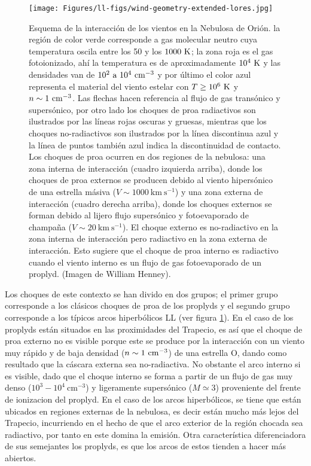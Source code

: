 \begin{figure}
  \centering
  \texttt{[image: Figures/ll-figs/wind-geometry-extended-lores.jpg]}
  \caption{Esquema de la interacción de los vientos en la Nebulosa de Orión. la región de color verde corresponde a gas molecular neutro cuya temperatura oscila entre los 50 y los \(1000~\mathrm{K}\); la zona roja es el gas fotoionizado, ahí la temperatura es de aproximadamente \(10^{4}~\mathrm{K}\) y las densidades van de \(10^{2} ~\text{a}~10^{4} ~\mathrm{cm}^{-3}\) y por último el color azul representa el material del viento estelar con \(T \geq 10^{6}~\mathrm{K}\) y \(n \sim 1~\mathrm{cm}^{-3}\). Las flechas hacen referencia al flujo de gas transónico y supersónico, por otro lado los choques de proa radiactivos son ilustrados por las líneas rojas oscuras y gruesas, mientras que los choques no-radiactivos son ilustrados por la línea discontinua azul y la línea de puntos también azul indica la discontinuidad de contacto. Los choques de proa ocurren en dos regiones de la nebulosa: una zona interna de interacción (cuadro izquierda arriba), donde los choques de proa externos se producen debido al viento hipersónico de una estrella másiva (\(V \sim 1000~\text{km}~\text{s}^{-1}\)) y una zona externa de interacción (cuadro derecha arriba), donde los  choques externos se forman debido al lijero  flujo supersónico y fotoevaporado de champaña (\(V \sim 20~\text{km}~\text{s}^{-1}\)). El choque externo es no-radiactivo en la zona interna de interacción pero radiactivo en la zona externa de interacción. Esto sugiere que el choque de proa interno es radiactivo cuando el viento interno es un flujo de gas fotoevaporado de un proplyd. (Imagen de William Henney). }
  \label{fig:esquema-interraccion-vientos}
\end{figure}

Los choques de este contexto se han divido en dos grupos; el primer grupo corresponde a los clásicos choques de proa de los proplyds \citep{Robberto:2005, Bally:1998a}  y el segundo grupo corresponde a los típicos arcos hiperbólicos LL (ver figura \ref{fig:esquema-interraccion-vientos}). En el caso de los proplyds están situados en las proximidades del Trapecio, es así que el choque de proa externo no es visible porque este se produce por la interacción con un viento muy rápido y de baja densidad (\(n \sim 1 ~\mathrm{cm}^{-3}\)) de una estrella O, dando como resultado que la cáscara externa sea no-radiactiva. No obstante el arco interno si es visible, dado que el choque interno se forma a partir de un flujo de gas muy denso (\(10^{3}-10^{4}~\text{cm}^{-3}\)) y ligeramente supersónico (\(M \simeq 3\)) proveniente del frente de ionizacion del proplyd. En el caso de los arcos hiperbólicos, se tiene que están ubicados en regiones externas de la nebulosa, es decir están mucho más lejos del Trapecio, incurriendo en el hecho de que el arco exterior de la región chocada sea radiactivo, por tanto en este domina la emisión. Otra característica diferenciadora de sus semejantes los proplyds, es que los arcos de estos tienden a hacer más abiertos.\\ 

